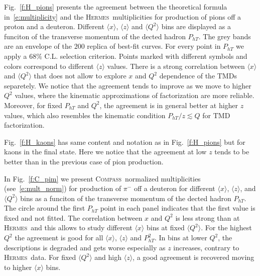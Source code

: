 \documentclass[aps,preprintnumbers,showpacs,nofootinbib,superscriptaddress,floatfix]{revtex4}
\newcommand{\hermes}{\textsc{Hermes}}
\newcommand{\compass}{\textsc{Compass}}
\begin{document}

Fig.~\ref{f:H_pions} presents the agreement between the theoretical formula in~\eqref{e:multiplicity} and the \hermes\ multiplicities for production of pions off a proton and a deuteron. 
Different $\langle x \rangle$, $\langle z \rangle$ and $\langle Q^2 \rangle$ bins are displayed as a funciton of the transverse momentum of the dected hadron $P_{hT}$.
The grey bands are an envelope of the $200$ replica of best-fit curves. For every point in $P_{hT}$ we apply a $68\%$ C.L. selection criterion. 
Points marked with different symbols and colors correspond to different $\langle z \rangle$ values. There is a strong correlation between $\langle x \rangle$ and $\langle Q^2 \rangle$ that does not allow to explore $x$ and $Q^2$ dependence of the TMDs separetely. 
We notice that the agreement tends to improve as we move to higher $Q^2$ values, where the kinematic approximations of factorization are more reliable. 
Moreover, for fixed $P_{hT}$ and $Q^2$, the agreement is in general better at higher $z$ values, which also resembles the kinematic condition $P_{hT}/z \lesssim Q$ for TMD factorization.

Fig.~\ref{f:H_kaons} has same content and notation as in Fig.~\ref{f:H_pions} but for kaons in the final state. Here we notice that the agreement at low $z$ tends to be better than in the previous case of pion production. 

In Fig.~\ref{f:C_pim} we present \compass\ normalized multiplicities (see~\eqref{e:mult_norm}) for production of $\pi^-$ off a deuteron for different $\langle x \rangle$, $\langle z \rangle$, and $\langle Q^2 \rangle$ bins as a funciton of the transverse momentum of the dected hadron $P_{hT}$. The circle around the first $P_{hT}$ point in each panel indicates that the first value is fixed and not fitted. 
The correlation between $x$ and $Q^2$ is less strong than at \hermes\ and this allows to study different $\langle x \rangle$ bins at fixed $\langle Q^2 \rangle$.
For the highest $Q^2$ the agreement is good for all $\langle x \rangle$, $\langle z \rangle$ and $P_{hT}^2$. In bins at lower $Q^2$, the descriptions is degraded and gets worse especially as $z$ increases, contrary to \hermes\ data. 
For fixed $\langle Q^2 \rangle$ and high $\langle z \rangle$, a good agreement is recovered moving to higher $\langle x \rangle$ bins.
\end{document}
